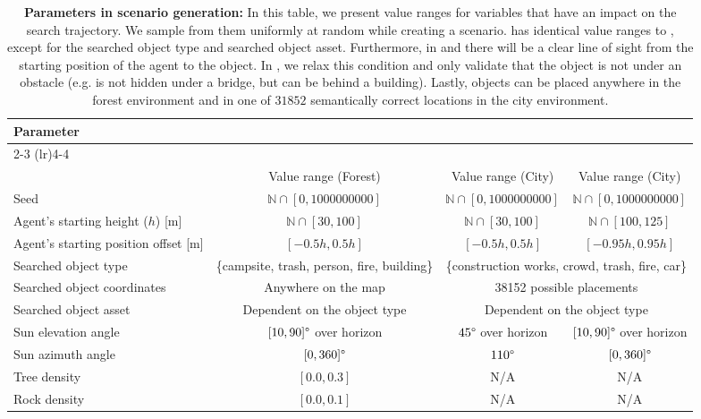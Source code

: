 \begin{table}[th]
\centering

\caption{\textbf{Parameters in scenario generation:} In this table, we present value ranges for variables that have an impact on the search trajectory. We sample from them uniformly at random while creating a scenario. \anomalychallenge{} has identical value ranges to \challenge{}, except for the searched object type and searched object asset. Furthermore, in \challenge{} and \anomalychallenge{} there will be a clear line of sight from the starting position of the agent to the object. In \hardchallenge{}, we relax this condition and only validate that the object is not under an obstacle (e.g. is not hidden under a bridge, but can be behind a building). Lastly, objects can be placed anywhere in the forest environment and in one of \(31852\) semantically correct locations in the city environment.}
\begin{scriptsize}
\begin{tabular}{lccc}
\toprule
\multirow{3}{*}{Parameter} & \multicolumn{2}{c}{\challenge{}} & \hardchallenge{} \\ 
\cmidrule(lr){2-3} \cmidrule(lr){4-4} \\ 
 & Value range (Forest) & Value range (City) & Value range (City) \\ \midrule
Seed & \( \mathbb{N} \cap [0, 1000000000]\) & \( \mathbb{N} \cap [0, 1000000000]\) & \( \mathbb{N} \cap [0, 1000000000]\) \\ \midrule
Agent's starting height (\(h\)) [m] & \(\mathbb{N} \cap [30, 100]\) & \(\mathbb{N} \cap [30, 100]\) & \(\mathbb{N} \cap [100, 125]\) \\
Agent's starting position offset [m] & \([-0.5h, 0.5h] \) & \([-0.5h, 0.5h] \) & \([-0.95h, 0.95h] \) \\ \midrule
Searched object type & \{campsite, trash, person, fire, building\} & \multicolumn{2}{c}{\{construction works, crowd, trash, fire, car\}}  \\ 
Searched object coordinates & Anywhere on the map & \multicolumn{2}{c}{38152 possible placements}  \\ 
Searched object asset & Dependent on the object type & \multicolumn{2}{c}{Dependent on the object type}  \\ \midrule 
Sun elevation angle & \([10, 90]\degree\) over horizon & $45\degree$ over horizon & \([10, 90]\degree\) over horizon \\ 
Sun azimuth angle & \([0, 360]\degree\) & $110\degree$ & \([0, 360]\degree\) \\ 
Tree density & \([0.0, 0.3]\) & N/A & N/A \\ 
Rock density & \([0.0, 0.1]\) & N/A & N/A \\ 
\midrule 


\end{tabular}
\end{scriptsize}
\end{table}
